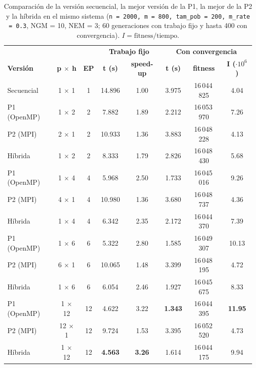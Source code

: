 \documentclass[12pt]{article}
\begin{document}
\begin{enumerate}
\begin{table}[htbp]
\centering
\small
\begin{tabular}{lcc|cc|ccc}
\toprule
 & & & \multicolumn{2}{c|}{\textbf{Trabajo fijo}} & \multicolumn{3}{c}{\textbf{Con convergencia}} \\
\textbf{Versión} & \textbf{p $\times$ h} & \textbf{EP} & \textbf{t (s)} & \textbf{speed-up} & \textbf{t (s)} & \textbf{fitness} & \textbf{I ($\cdot 10^6$)} \\
\midrule
Secuencial & 1 $\times$ 1 & 1 & 14.896 & 1.00 & 3.975 & 16\,044\,825 & 4.04 \\
\midrule
P1 (OpenMP) & 1 $\times$ 2 & 2 & 7.882 & 1.89 & 2.212 & 16\,053\,970 & 7.26 \\
P2 (MPI) & 2 $\times$ 1 & 2 & 10.933 & 1.36 & 3.883 & 16\,048\,228 & 4.13 \\
Híbrida & 1 $\times$ 2 & 2 & 8.333 & 1.79 & 2.826 & 16\,048\,430 & 5.68 \\
\midrule
P1 (OpenMP) & 1 $\times$ 4 & 4 & 5.968 & 2.50 & 1.733 & 16\,045\,016 & 9.26 \\
P2 (MPI) & 4 $\times$ 1 & 4 & 10.980 & 1.36 & 3.680 & 16\,048\,737 & 4.36 \\
Híbrida & 1 $\times$ 4 & 4 & 6.342 & 2.35 & 2.172 & 16\,044\,370 & 7.39 \\
\midrule
P1 (OpenMP) & 1 $\times$ 6 & 6 & 5.322 & 2.80 & 1.585 & 16\,049\,307 & 10.13 \\
P2 (MPI) & 6 $\times$ 1 & 6 & 10.065 & 1.48 & 3.399 & 16\,048\,195 & 4.72 \\
Híbrida & 1 $\times$ 6 & 6 & 6.054 & 2.46 & 1.927 & 16\,045\,675 & 8.33 \\
\midrule
P1 (OpenMP) & 1 $\times$ 12 & 12 & 4.622 & 3.22 & \textbf{1.343} & 16\,044\,395 & \textbf{11.95} \\
P2 (MPI) & 12 $\times$ 1 & 12 & 9.724 & 1.53 & 3.395 & 16\,052\,520 & 4.73 \\
Híbrida & 1 $\times$ 12 & 12 & \textbf{4.563} & \textbf{3.26} & 1.614 & 16\,044\,175 & 9.94 \\
\bottomrule
\end{tabular}
\caption{Comparación de la versión secuencial, la mejor versión de la P1, la mejor de la P2 y la híbrida en el mismo sistema (\texttt{n = 2000, m = 800, tam\_pob = 200, m\_rate = 0.3}, NGM = 10, NEM = 3; 60 generaciones con trabajo fijo y hasta 400 con convergencia). $I = \text{fitness}/\text{tiempo}$.}
\label{tab:c2_comparacion}
\end{table}


\end{enumerate}
\end{document}
